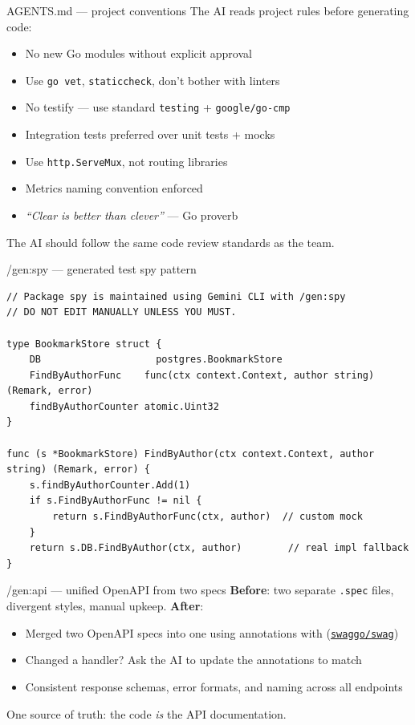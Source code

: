 \documentclass[aspectratio=169,11pt]{beamer}
\begin{document}
\begin{frame}{AGENTS.md --- project conventions}
  The AI reads project rules before generating code:
  \begin{itemize}
    \setlength\itemsep{4pt}
    \item No new Go modules without explicit approval
    \item Use \texttt{go vet}, \texttt{staticcheck}, don't bother with linters
    \item No testify --- use standard \texttt{testing} + \texttt{google/go-cmp}
    \item Integration tests preferred over unit tests + mocks
    \item Use \texttt{http.ServeMux}, not routing libraries
    \item Metrics naming convention enforced
    \item \emph{``Clear is better than clever''} --- Go proverb
  \end{itemize}

  \vspace{6pt}
  \alert{The AI should follow the same code review standards as the team.}
\end{frame}

\begin{frame}[fragile]{/gen:spy --- generated test spy pattern}
\begin{lstlisting}
// Package spy is maintained using Gemini CLI with /gen:spy
// DO NOT EDIT MANUALLY UNLESS YOU MUST.

type BookmarkStore struct {
	DB                    postgres.BookmarkStore
	FindByAuthorFunc    func(ctx context.Context, author string) (Remark, error)
	findByAuthorCounter atomic.Uint32
}

func (s *BookmarkStore) FindByAuthor(ctx context.Context, author string) (Remark, error) {
	s.findByAuthorCounter.Add(1)
	if s.FindByAuthorFunc != nil {
		return s.FindByAuthorFunc(ctx, author)  // custom mock
	}
	return s.DB.FindByAuthor(ctx, author)        // real impl fallback
}
\end{lstlisting}
\end{frame}

\begin{frame}{/gen:api --- unified OpenAPI from two specs}
  \textbf{Before}: two separate \texttt{.spec} files, divergent styles, manual upkeep.
  \textbf{After}:

  \vspace{6pt}
  \begin{itemize}
    \setlength\itemsep{4pt}
    \item Merged two OpenAPI specs into one using annotations with (\href{https://github.com/swaggo/swag}{\texttt{swaggo/swag}})
    \item Changed a handler? Ask the AI to update the annotations to match
    \item Consistent response schemas, error formats, and naming across all endpoints
  \end{itemize}

  \vspace{6pt}
  \alert{One source of truth}: the code \emph{is} the API documentation.
\end{frame}
\end{document}

